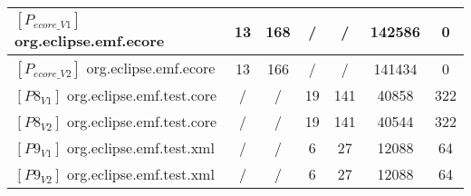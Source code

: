 \begin{table*}[t]
{\begin{tabular}{lcccccc}
\midrule		
\midrule
$[P_{ecore\_V1}]$ org.eclipse.emf.ecore & 13 & 168& /& / & 142586 & 0 \\
\midrule
$[P_{ecore\_V2}]$ org.eclipse.emf.ecore & 13 & 166 & /  & / & 141434 & 0 \\ 

\midrule
		
		
$[P8_{V1}]$ org.eclipse.emf.test.core & / & / &19 & 141 & 40858 & 322 \\
\midrule
$[P8_{V2}]$ org.eclipse.emf.test.core & / & / &19  & 141 & 40544 & 322 \\ 

\midrule
		
$[P9_{V1}]$ org.eclipse.emf.test.xml & / & / & 6& 27 & 12088 & 64 \\
\midrule
$[P9_{V2}]$ org.eclipse.emf.test.xml & /& / &6  & 27 & 12088 & 64 \\ 


   \bottomrule		
	\end{tabular}
}

\end{table*}

